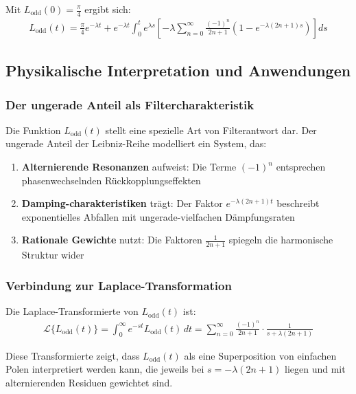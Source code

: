 \documentclass[a4paper,12pt,twoside]{report}
\theoremstyle{definition}
\begin{document}
Mit $L_{\text{odd}}(0) = \frac{\pi}{4}$ ergibt sich:
\begin{align}
	L_{\text{odd}}(t) = \frac{\pi}{4} e^{-\lambda t} + e^{-\lambda t} \int_0^t e^{\lambda s} \left[ -\lambda \sum_{n=0}^{\infty} \frac{(-1)^n}{2n+1}(1-e^{-\lambda(2n+1)s}) \right] ds
\end{align}

\subsection{Physikalische Interpretation und Anwendungen}

\subsubsection*{Der ungerade Anteil als Filtercharakteristik}

Die Funktion $L_{\text{odd}}(t)$ stellt eine spezielle Art von Filterantwort dar. Der ungerade Anteil der Leibniz-Reihe modelliert ein System, das:

\begin{enumerate}
	\item \textbf{Alternierende Resonanzen} aufweist: Die Terme $(-1)^n$ entsprechen phasenwechselnden Rückkopplungseffekten
	\item \textbf{Damping-charakteristiken} trägt: Der Faktor $e^{-\lambda(2n+1)t}$ beschreibt exponentielles Abfallen mit ungerade-vielfachen Dämpfungsraten
	\item \textbf{Rationale Gewichte} nutzt: Die Faktoren $\frac{1}{2n+1}$ spiegeln die harmonische Struktur wider
\end{enumerate}

\subsubsection*{Verbindung zur Laplace-Transformation}

Die Laplace-Transformierte von $L_{\text{odd}}(t)$ ist:
\begin{align}
	\mathcal{L}\{L_{\text{odd}}(t)\} = \int_0^{\infty} e^{-st} L_{\text{odd}}(t) \, dt = \sum_{n=0}^{\infty} \frac{(-1)^n}{2n+1} \cdot \frac{1}{s + \lambda(2n+1)}
\end{align}

Diese Transformierte zeigt, dass $L_{\text{odd}}(t)$ als eine Superposition von einfachen Polen interpretiert werden kann, die jeweils bei $s = -\lambda(2n+1)$ liegen und mit alternierenden Residuen gewichtet sind.
\end{document}
